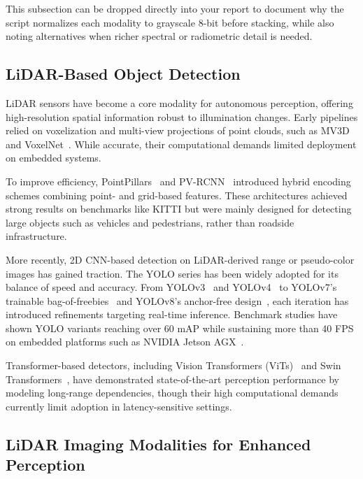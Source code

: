 \documentclass[runningheads]{llncs}
\begin{document}
This subsection can be dropped directly into your report to document why the script normalizes each modality to grayscale 8-bit before stacking, while also noting alternatives when richer spectral or radiometric detail is needed.

\subsection{LiDAR-Based Object Detection}

LiDAR sensors have become a core modality for autonomous perception, offering high-resolution spatial information robust to illumination changes. Early pipelines relied on voxelization and multi-view projections of point clouds, such as MV3D~\cite{chen2017multi} and VoxelNet~\cite{zhou2018voxelnet}. While accurate, their computational demands limited deployment on embedded systems.

To improve efficiency, PointPillars~\cite{lang2019pointpillars} and PV-RCNN~\cite{shi2020pv} introduced hybrid encoding schemes combining point- and grid-based features. These architectures achieved strong results on benchmarks like KITTI but were mainly designed for detecting large objects such as vehicles and pedestrians, rather than roadside infrastructure.

More recently, 2D CNN-based detection on LiDAR-derived range or pseudo-color images has gained traction. The YOLO series has been widely adopted for its balance of speed and accuracy. From YOLOv3~\cite{redmon2018yolov3} and YOLOv4~\cite{bochkovskiy2020yolov4} to YOLOv7’s trainable bag-of-freebies~\cite{wang2023yolov7} and YOLOv8’s anchor-free design~\cite{jocher2023ultralytics}, each iteration has introduced refinements targeting real-time inference. Benchmark studies have shown YOLO variants reaching over 60 mAP while sustaining more than 40 FPS on embedded platforms such as NVIDIA Jetson AGX~\cite{lazarevich2023yolobench}.

Transformer-based detectors, including Vision Transformers (ViTs)~\cite{dosovitskiy2020image} and Swin Transformers~\cite{liu2022swin}, have demonstrated state-of-the-art perception performance by modeling long-range dependencies, though their high computational demands currently limit adoption in latency-sensitive settings.


\subsection{LiDAR Imaging Modalities for Enhanced Perception}
\end{document}
